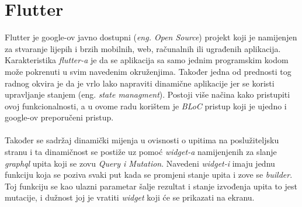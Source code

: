 \documentclass[times, utf8, zavrsni]{fer}
\begin{document}
\section{Flutter}
Flutter je google-ov javno dostupni (\textit{eng. Open Source}) projekt koji je namijenjen
za stvaranje lijepih i brzih mobilnih, web, računalnih ili ugrađenih aplikacija. Karakteristika
\textit{flutter-a } je da se aplikacija sa samo jednim programskim kodom može pokrenuti u
svim navedenim okruženjima. Također jedna od prednosti tog radnog okvira je da je vrlo lako napraviti
dinamične aplikacije jer se koristi upravljanje stanjem (eng. \textit{state managment}). Postoji više načina
kako pristupiti ovoj funkcionalnosti, a u ovome radu korištem je \textit{BLoC} pristup koji je ujedno
i google-ov preporučeni pristup.
\\\\
Također se sadržaj dinamički mijenja u ovisnosti o upitima na poslužiteljsku stranu i ta dinamičnost
se postiže uz pomoć \textit{widget-a} namijenjenih za slanje \textit{graphql} upita koji se zovu \textit{Query i Mutation}.
Navedeni \textit{widget-i} imaju jednu funkciju koja se poziva svaki put kada se promjeni stanje upita i
zove se \textit{builder}. Toj funkciju se kao ulazni parametar šalje rezultat i stanje izvođenja upita to jest mutacije,
i dužnost joj je vratiti \textit{widget} koji će se prikazati na ekranu.
\end{document}
